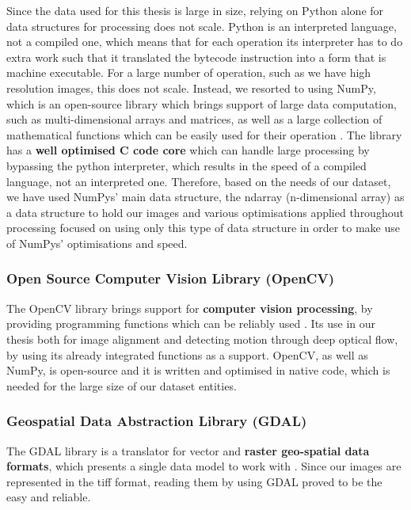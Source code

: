 \documentclass[12pt, a4paper]{report}
\begin{document}
	\par Since the data used for this thesis is large in size, relying on Python alone for data structures for processing does not scale. Python is an interpreted language, not a compiled one, which means that for each operation its interpreter has to do extra work such that it translated the bytecode instruction into a form that is machine executable. For a large number of operation, such as we have high resolution images, this does not scale. Instead, we resorted to using NumPy, which is an open-source library which brings support of large data computation, such as multi-dimensional arrays and matrices, as well as a large collection of mathematical functions which can be easily used for their operation \cite{HARRIS2020}. The library has a \textbf{well optimised C code core} which can handle large processing by bypassing the python interpreter, which results in the speed of a compiled language, not an interpreted one. Therefore, based on the needs of our dataset, we have used NumPys' main data structure, the ndarray (n-dimensional array) as a data structure to hold our images and various optimisations applied throughout processing focused on using only this type of data structure in order to make use of NumPys' optimisations and speed.
	
	\subsubsection{Open Source Computer Vision Library (OpenCV)}
	
	\par The OpenCV library brings support for \textbf{computer vision processing}, by providing programming functions which can be reliably used \cite{cuda}. Its use in our thesis both for image alignment and detecting motion through deep optical flow, by using its already integrated functions as a support. OpenCV, as well as NumPy, is open-source and it is written and optimised in native code, which is needed for the large size of our dataset entities.
	
	\subsubsection{Geospatial Data Abstraction Library (GDAL)}
	
	\par The GDAL library is a translator for vector and \textbf{raster geo-spatial data formats}, which presents a single data model to work with \cite{gdal}. Since our images are represented in the tiff format, reading them by using GDAL proved to be the easy and reliable.
	
\end{document}
